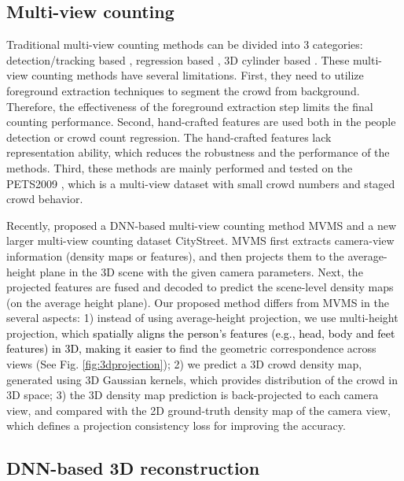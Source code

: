 \documentclass[letterpaper]{article} %
\newcommand{\abc}[1]{\textcolor{black}{#1}}
\newcommand{\citep}{\cite}
\newcommand{\citealp}[1]{\citeauthor{#1} \citeyear{#1}}
\begin{document}
\subsection{Multi-view counting}

Traditional multi-view counting methods can be divided into 3 categories: detection/tracking based \citep{dittrich2017people,li2012people,ma2012reliable,Maddalena2014people}, regression based \citep{Ryan2014Scene,Tang2014Cross}, 3D cylinder based \citep{Ge2010Crowd}. These multi-view counting methods have several limitations. First, they need to utilize foreground extraction techniques to segment the crowd from background. Therefore, the effectiveness of the foreground extraction step limits the final counting performance. Second, hand-crafted features are used both in the people detection or crowd count regression. The hand-crafted features lack representation ability, which reduces the robustness and the performance of the methods. Third, these methods are mainly performed and tested on the PETS2009 \citep{ferryman2009pets2009}, which is a multi-view dataset with small crowd numbers and staged crowd behavior.

Recently, \citealp{zhang2019wide} proposed a DNN-based multi-view counting method MVMS and a new larger multi-view counting dataset CityStreet. MVMS first extracts camera-view information (density maps or features), and then projects them to the average-height plane in the 3D scene with the given camera parameters. Next, the projected features are fused and decoded to predict the scene-level density maps (on the average height plane). Our proposed method differs from MVMS in the several aspects: 1) instead of using average-height projection, we use multi-height projection, which \abc{spatially aligns the person's features (e.g., head, body and feet features) in 3D, making it easier to} find the geometric correspondence across views (See Fig. \ref{fig:3dprojection}); 2) we predict a 3D crowd density map, generated using 3D Gaussian kernels, which provides distribution of the crowd in 3D space; 3) the 3D density map prediction is back-projected to each camera view, and compared with the 2D ground-truth density map of the camera view, which defines a projection consistency loss for improving the accuracy.


\subsection{DNN-based 3D reconstruction}
\end{document}
